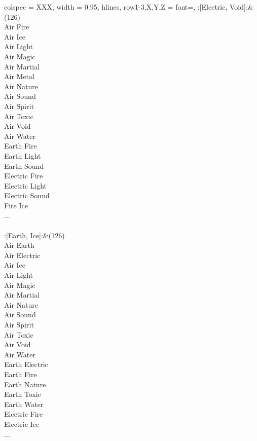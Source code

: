 \twocolumn
\begin{longtblr}[
	caption = {2v2 Defending Weak},
	label = {2v2-Defending-Weak},
]{
	colspec = {XXX}, width = 0.95\linewidth,
	hlines,
	row{1-3,X,Y,Z} = {font=\bfseries},
}
	:[Electric, Void]:&{(126)\\
	Air Fire \\
	Air Ice \\
	Air Light \\
	Air Magic \\
	Air Martial \\
	Air Metal \\
	Air Nature \\
	Air Sound \\
	Air Spirit \\
	Air Toxic \\
	Air Void \\
	Air Water \\
	Earth Fire \\
	Earth Light \\
	Earth Sound \\
	Electric Fire \\
	Electric Light \\
	Electric Sound \\
	Fire Ice \\
	...\\
	}\\

	:[Earth, Ice]:&{(126)\\
	Air Earth \\
	Air Electric \\
	Air Ice \\
	Air Light \\
	Air Magic \\
	Air Martial \\
	Air Nature \\
	Air Sound \\
	Air Spirit \\
	Air Toxic \\
	Air Void \\
	Air Water \\
	Earth Electric \\
	Earth Fire \\
	Earth Nature \\
	Earth Toxic \\
	Earth Water \\
	Electric Fire \\
	Electric Ice \\
	...\\
	}\\


\end{longtblr}

